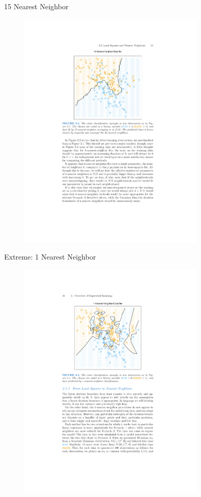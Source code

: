 \documentclass[11pt,handout,xcolor=pdftex,dvipsnames,table,mathserif,aspectratio=169]{beamer}
\begin{document}
\begin{frame}{15 Nearest Neighbor}
\begin{figure}[htbp]
\begin{center}
\includegraphics[width=3.5in]{./resources/classifier15nn.pdf}
\label{class15nn}
\end{center}
\end{figure}
\end{frame}

\begin{frame}{Extreme: 1 Nearest Neighbor}
\begin{figure}[htbp]
\begin{center}
\includegraphics[width=3.5in]{./resources/classifier1nn.pdf}
\label{class15nn}
\end{center}
\end{figure}
\end{frame}
\end{document}
